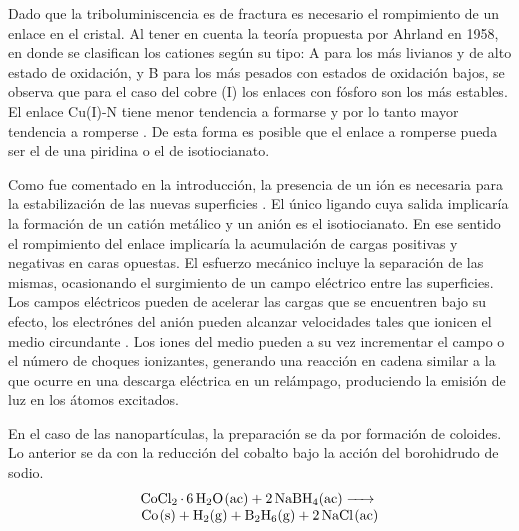 \documentclass[fleqn,10pt]{SelfArx}
\begin{document}
Dado que la triboluminiscencia es de fractura es necesario el rompimiento de un enlace en el cristal. Al tener en cuenta la teor\'ia propuesta por Ahrland en 1958, en donde se clasifican los cationes seg\'un su tipo: A para los m\'as livianos y de alto estado de oxidaci\'on, y B para los m\'as pesados con estados de oxidaci\'on bajos, se observa que para el caso del cobre (I) los enlaces con f\'osforo son los m\'as estables. El enlace Cu(I)-N tiene menor tendencia a formarse y por lo tanto mayor tendencia a romperse \cite{ahrland_chatt_davies_1958}. De esta forma es posible que el enlace a romperse pueda ser el de una piridina o el de isotiocianato.

Como fue comentado en la introducci\'on, la presencia de un i\'on es necesaria para la estabilizaci\'on de las nuevas superficies \cite{olawale_okoli_fontenot_hollerman_2016}\cite{marchetti_di_nicola_pettinari_timokhin_pettinari_2012}. El \'unico ligando cuya salida implicar\'ia la formaci\'on de un cati\'on met\'alico y un ani\'on es el isotiocianato. En ese sentido el rompimiento del enlace implicar\'ia la acumulaci\'on de cargas positivas y negativas en caras opuestas. El esfuerzo mec\'anico incluye la separaci\'on de las mismas, ocasionando el surgimiento de un campo el\'ectrico entre las superficies. Los campos el\'ectricos pueden de acelerar las cargas que se encuentren bajo su efecto, los electr\'ones del ani\'on pueden alcanzar velocidades tales que ionicen el medio circundante \cite{olawale_okoli_fontenot_hollerman_2016}. Los iones del medio pueden a su vez incrementar el campo o el n\'umero de choques ionizantes, generando una reacci\'on en cadena similar a la que ocurre en una descarga el\'ectrica en un rel\'ampago, produciendo la emisi\'on de luz en los \'atomos excitados. 

En el caso de las nanopart\'iculas, la preparaci\'on se da por formaci\'on de coloides. Lo anterior se da con la reducci\'on del cobalto bajo la acci\'on del borohidrudo de sodio.
\begin{equation}
	\begin{array}{r}
		\ce{CoCl2.6H2O(ac) + 2NaBH4(ac) ->} \\
		\ce{Co(s) + H2(g) + B2H6(g) + 2NaCl(ac)}
	\end{array}	
\end{equation}
\end{document}
